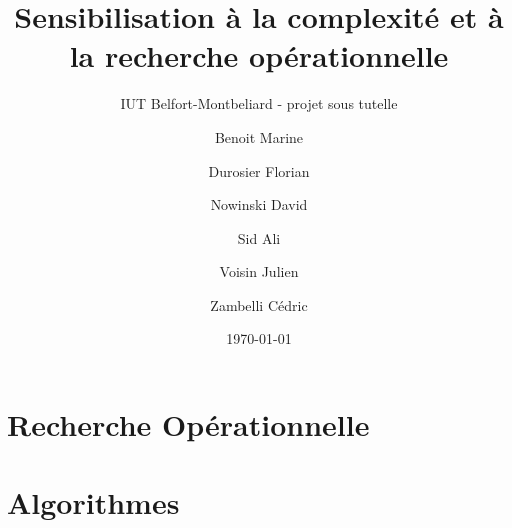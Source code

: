\documentclass{beamer}
\title{Sensibilisation à la complexité et à la recherche opérationnelle}
\subtitle{IUT Belfort-Montbeliard - projet sous tutelle}
\author{Benoit Marine \and Durosier Florian \and Nowinski David \and Sid Ali \and Voisin Julien \and Zambelli Cédric}
\date{\today}
\begin{document}
\begin{frame}
    \maketitle
\end{frame}

\begin{frame}
    \tableofcontents
\end{frame}

\section{Recherche Opérationnelle}
    \begin{frame}
    \end{frame}

\section{Algorithmes}
    \begin{frame}
    \end{frame}
\end{document}
